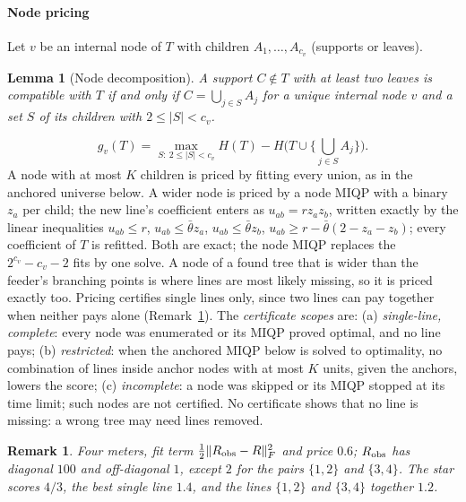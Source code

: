 \documentclass[journal,onecolumn,11pt]{IEEEtran}
\newtheorem{lemma}{Lemma}
\newtheorem{remark}{Remark}
\begin{document}
\paragraph*{Node pricing} Let $v$ be an internal node of $T$ with children $A_1,\dots,A_{c_v}$ (supports or leaves).
\begin{lemma}[Node decomposition]\label{lem:node}
A support $C\notin T$ with at least two leaves is compatible with $T$ if and only if $C=\bigcup_{j\in S}A_j$ for a unique
internal node $v$ and a set $S$ of its children with $2\le|S|<c_v$.
\end{lemma}
\begin{equation}\label{eq:price}
g_v(T)=\max_{S:\ 2\le|S|<c_v}H(T)-H\Big(T\cup\Big\{\textstyle\bigcup_{j\in S}A_j\Big\}\Big).
\end{equation}
A node with at most $K$ children is priced by fitting every union, as in the anchored universe below. A wider node is
priced by a node MIQP with a binary $z_a$
per child; the new line's coefficient enters as $u_{ab}=rz_az_b$, written exactly by the linear inequalities $u_{ab}\le r$,
$u_{ab}\le\bar\theta z_a$, $u_{ab}\le\bar\theta z_b$, $u_{ab}\ge r-\bar\theta(2-z_a-z_b)$; every coefficient of $T$ is
refitted. Both are exact; the node MIQP replaces the $2^{c_v}-c_v-2$ fits by one solve. A node of a found tree that is wider
than the feeder's branching points is where lines are most likely missing, so it is priced exactly too. Pricing certifies single lines only, since two lines can pay together when neither pays alone
(Remark~\ref{rem:pairs}). The \emph{certificate scopes} are: (a) \emph{single-line, complete}: every node was enumerated or
its MIQP proved optimal, and no line pays; (b) \emph{restricted}: when the anchored MIQP below is solved to optimality, no
combination of lines inside anchor nodes with at most $K$ units, given the anchors, lowers the score; (c)
\emph{incomplete}: a node was skipped or its MIQP stopped at its time limit; such nodes are not certified. No certificate
shows that no line is missing: a wrong tree may need lines removed.
\begin{remark}\label{rem:pairs}
Four meters, fit term $\tfrac12\|R_{\rm obs}-R\|_F^2$ and price $0.6$; $R_{\rm obs}$ has diagonal $100$ and off-diagonal
$1$, except $2$ for the pairs $\{1,2\}$ and $\{3,4\}$. The star scores $4/3$, the best single line $1.4$, and the lines
$\{1,2\}$ and $\{3,4\}$ together $1.2$.
\end{remark}
\end{document}
